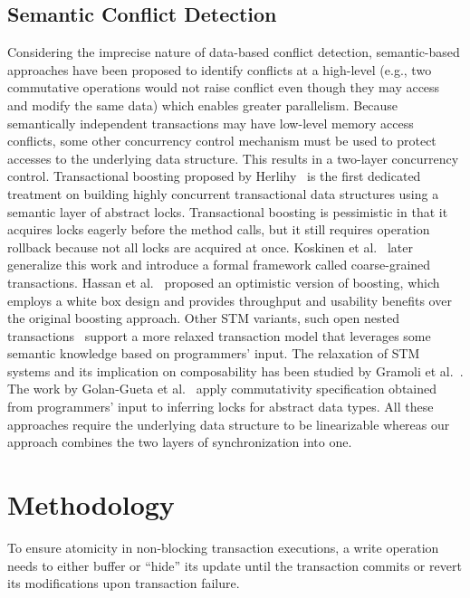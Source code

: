 \documentclass[10pt,conference,compsocconf]{IEEEtran}
\begin{document}
\subsection{Semantic Conflict Detection}
Considering the imprecise nature of data-based conflict detection, semantic-based approaches have been proposed to identify conflicts at a high-level (e.g., two commutative operations would not raise conflict even though they may access and modify the same data) which enables greater parallelism.
Because semantically independent transactions may have low-level memory access conflicts, some other concurrency control mechanism must be used to protect accesses to the underlying data structure.
This results in a two-layer concurrency control.
Transactional boosting proposed by Herlihy~\cite{herlihy2008transactional} is the first dedicated treatment on building highly concurrent transactional data structures using a semantic layer of abstract locks. 
Transactional boosting is pessimistic in that it acquires locks eagerly before the method calls, but it still requires operation rollback because not all locks are acquired at once.
Koskinen et al.~\cite{koskinen2010coarse} later generalize this work and introduce a formal framework called coarse-grained transactions.
Hassan et al.~\cite{hassan2014developing} proposed an optimistic version of boosting, which employs a white box design and provides throughput and usability benefits over the original boosting approach.
Other STM variants, such open nested transactions~\cite{ni2007open} support a more relaxed transaction model that leverages some semantic knowledge based on programmers' input.
The relaxation of STM systems and its implication on composability has been studied by Gramoli et al.~\cite{gramoli2013composing}.
The work by Golan-Gueta et al.~\cite{golan2015automatic} apply commutativity specification obtained from programmers' input to inferring locks for abstract data types.
All these approaches require the underlying data structure to be linearizable whereas our approach combines the two layers of synchronization into one.

\section{Methodology}
\label{sec:algorithm}
To ensure atomicity in non-blocking transaction executions, a write operation needs to either buffer or ``hide'' its update until the transaction commits or revert its modifications upon transaction failure.
\end{document}

